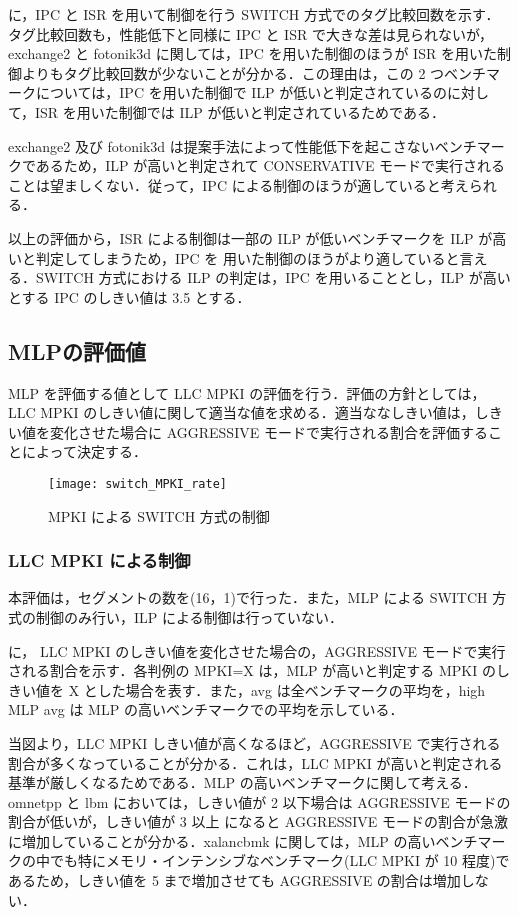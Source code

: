に，IPC と ISR を用いて制御を行う SWITCH 方式でのタグ比較回数を示す．タグ比較回数も，性能低下と同様に IPC と ISR で大きな差は見られないが，exchange2 と fotonik3d に関しては，IPC を用いた制御のほうが ISR を用いた制御よりもタグ比較回数が少ないことが分かる．この理由は，この 2 つベンチマークについては，IPC を用いた制御で ILP が低いと判定されているのに対して，ISR を用いた制御では ILP が低いと判定されているためである．

exchange2 及び fotonik3d は提案手法によって性能低下を起こさないベンチマークであるため，ILP が高いと判定されて CONSERVATIVE モードで実行されることは望ましくない．従って，IPC による制御のほうが適していると考えられる．

以上の評価から，ISR による制御は一部の ILP が低いベンチマークを ILP が高いと判定してしまうため，IPC を 用いた制御のほうがより適していると言える．SWITCH 方式における ILP の判定は，IPC を用いることとし，ILP が高いとする IPC のしきい値は 3.5 とする．

\subsection{MLPの評価値}
MLP を評価する値として LLC MPKI の評価を行う．評価の方針としては，LLC MPKI のしきい値に関して適当な値を求める．適当ななしきい値は，しきい値を変化させた場合に AGGRESSIVE モードで実行される割合を評価することによって決定する．

\begin{figure}[htb]
  \centering
  \texttt{[image: switch\_MPKI\_rate]}
  \caption{MPKI による SWITCH 方式の制御}
  \label{fig:switch_MPKI_rate}
\end{figure}

\subsubsection{LLC MPKI による制御}
本評価は，セグメントの数を(16，1)で行った．また，MLP による SWITCH 方式の制御のみ行い，ILP による制御は行っていない．

に， LLC MPKI のしきい値を変化させた場合の，AGGRESSIVE モードで実行される割合を示す．各判例の MPKI=X は，MLP が高いと判定する MPKI のしきい値を X とした場合を表す．また，avg は全ベンチマークの平均を，high MLP avg は MLP の高いベンチマークでの平均を示している． 

当図より，LLC MPKI しきい値が高くなるほど，AGGRESSIVE で実行される割合が多くなっていることが分かる．これは，LLC MPKI が高いと判定される基準が厳しくなるためである．MLP の高いベンチマークに関して考える．omnetpp と lbm においては，しきい値が 2 以下場合は AGGRESSIVE モードの割合が低いが，しきい値が 3 以上 になると AGGRESSIVE モードの割合が急激に増加していることが分かる．xalancbmk に関しては，MLP の高いベンチマークの中でも特にメモリ・インテンシブなベンチマーク(LLC MPKI が 10 程度)であるため，しきい値を 5 まで増加させても AGGRESSIVE の割合は増加しない．

